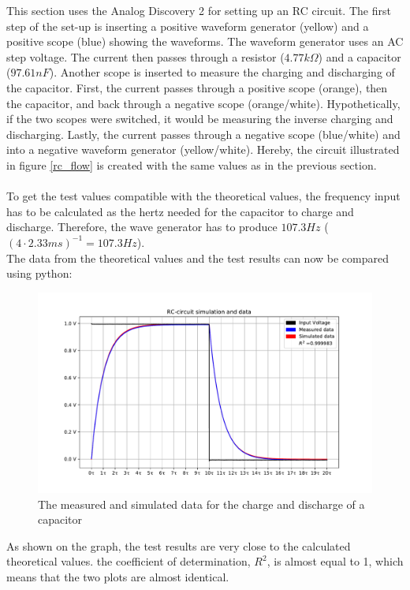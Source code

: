 This section uses the Analog Discovery 2 for setting up an RC circuit. The first step of the set-up is inserting a positive waveform generator (yellow) and a positive scope (blue) showing the waveforms. The waveform generator uses an AC step voltage. The current then passes through a resistor ($4.77 k\Omega$) and a capacitor ($97.61 nF$). Another scope is inserted to measure the charging and discharging of the capacitor. First, the current passes through a positive scope (orange), then the capacitor, and back through a negative scope (orange/white). Hypothetically, if the two scopes were switched, it would be measuring the inverse charging and discharging. Lastly, the current passes through a negative scope (blue/white) and into a negative waveform generator (yellow/white). Hereby, the circuit illustrated in figure \ref{rc_flow} is created with the same values as in the previous section. \\ \\
To get the test values compatible with the theoretical values, the frequency input has to be calculated as the hertz needed for the capacitor to charge and discharge. Therefore, the wave generator has to produce $107.3 Hz$  ($(4 \cdot 2.33 ms)^{-1} = 107.3 Hz$). \\
The data from the theoretical values and the test results can now be compared using python:
\begin{figure}[H]
\center
\includegraphics[scale=0.6]{fig/img/eks_1}
\caption{The measured and simulated data for the charge and discharge of a capacitor}
\label{fig:Cap}
\end{figure}
\noindent As shown on the graph, the test results are very close to the calculated theoretical values. the coefficient of determination, $R^2$, is almost equal to 1, which means that the two plots are almost identical.

